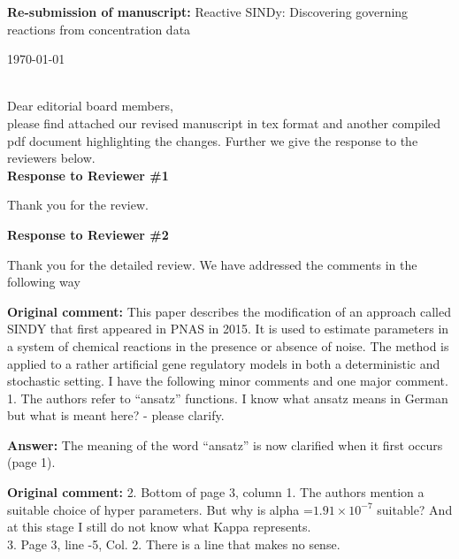 \documentclass[11pt,english]{scrartcl}
\begin{document}

\begin{flushleft}
    \large
    \textbf{Re-submission of manuscript:} Reactive SINDy: Discovering governing reactions from concentration data
\end{flushleft}
\begin{flushright}
    \today
\end{flushright}
~\\

Dear editorial board members,\\

please find attached our revised manuscript in tex format and another compiled pdf document highlighting the changes. Further we give the response to the reviewers below.\\

\textbf{{\large Response to Reviewer \#1}}\newline

Thank you for the review.\newline

\textbf{{\large Response to Reviewer \#2}}\newline

Thank you for the detailed review. We have addressed the comments in the
following way\newline

\textbf{Original comment:}
{This paper describes the modification of an approach called SINDY that first appeared in PNAS in 2015. It is used to estimate parameters in a system of chemical reactions in the presence or absence of noise. The method is applied to a rather artificial gene regulatory models in both a deterministic and stochastic setting. I have the following minor comments and one major comment.\\
1. The authors refer to ``ansatz'' functions. I know what ansatz means in German but what is meant here? - please clarify.}\newline

\textbf{Answer:}
The meaning of the word ``ansatz'' is now clarified when it first occurs (page 1).\newline

\textbf{Original comment:}
{2. Bottom of page 3, column 1. The authors mention a suitable choice of hyper parameters. But why is alpha =$1.91\times 10^{-7}$ suitable? And at this stage I still do not know what Kappa represents.\\
3. Page 3, line -5, Col. 2. There is a line that makes no sense.}\newline
\end{document}
